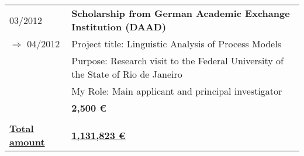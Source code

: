 \begin{tabular}{P{3cm}P{12cm}}																																								
03/2012															& \textbf{Scholarship from German Academic Exchange Institution (DAAD)}	\\
	\hspace*{0.4cm} $\Rightarrow$ 04/2012 	& Project title: Linguistic Analysis of Process Models \\
																		& Purpose: Research visit to the Federal University of the State of Rio de Janeiro  \\
																		& My Role: Main applicant and principal investigator\\	\noalign{\smallskip}																				
																		& \textbf{2,500 \euro} \\
																		\\
\underline{\textbf{Total amount}}					& \underline{\textbf{1,131,823 \euro}} \\																																														
\end{tabular}